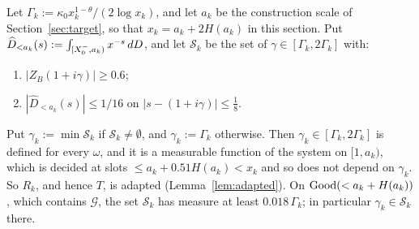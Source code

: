 \begin{lemma}\label{lem:goodheights}
Let $\Gamma_k:=\kappa_0x_k^{1-\theta}/(2\log x_k)$, and let $a_k$ be the construction scale of Section~\ref{sec:target}, so that
$x_k=a_k+2H(a_k)$ in this section. Put $\widehat D_{<a_k}(s):=\int_{[X_0^{-},a_k)}x^{-s}\,dD$, and let $\mathcal S_k$ be the set of
$\gamma\in[\Gamma_k,2\Gamma_k]$ with:
\begin{enumerate}[label=(\roman*)]
\item $|Z_B(1+i\gamma)|\ge0.6$;
\item $|\widehat D_{<a_k}(s)|\le1/16$ on $|s-(1+i\gamma)|\le\tfrac18$.
\end{enumerate}
Put $\gamma_k:=\min\mathcal S_k$ if $\mathcal S_k\ne\emptyset$, and $\gamma_k:=\Gamma_k$ otherwise. Then $\gamma_k\in[\Gamma_k,2\Gamma_k]$ is
defined for every $\omega$, and it is a measurable function of the system on $[1,a_k)$, which is decided at slots
$\le a_k+0.51H(a_k)<x_k$ and so does not depend on $\gamma_k$. So $R_k$, and hence $T$, is adapted (Lemma~\ref{lem:adapted}).
On $\mathrm{Good}(<a_k+H(a_k))$, which contains $\mathcal G$, the set $\mathcal S_k$ has measure at least $0.018\,\Gamma_k$; in particular
$\gamma_k\in\mathcal S_k$ there.
\end{lemma}
